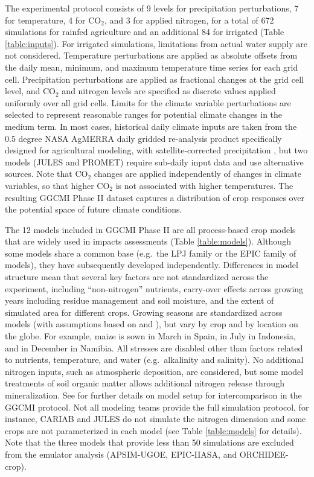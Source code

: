 \documentclass[gmd, manuscript]{copernicus} %
\begin{document}
The experimental protocol consists of 9 levels for precipitation perturbations, 7 for temperature, 4 for CO$_2$, and 3 for applied nitrogen, for a total of 672 simulations for rainfed agriculture and an additional 84 for irrigated (Table \ref{table:inputs}). For irrigated simulations, limitations from actual water supply are not considered. Temperature perturbations are applied as absolute offsets from the daily mean, minimum, and maximum temperature time series for each grid cell. Precipitation perturbations are applied as fractional changes at the grid cell level, and CO$_2$ and nitrogen levels are specified as discrete values applied uniformly over all grid cells. Limits for the climate variable perturbations are selected to represent reasonable ranges for potential climate changes in the medium term. In most cases, historical daily climate inputs are taken from the 0.5 degree NASA AgMERRA daily gridded re-analysis product specifically designed for agricultural modeling, with satellite-corrected precipitation \citep{Ruane2015}, but two models (JULES and PROMET) require sub-daily input data and use alternative sources. Note that CO$_2$ changes are applied independently of changes in climate variables, so that higher CO$_2$ is not associated with higher temperatures. The resulting GGCMI Phase II dataset captures a distribution of crop responses over the potential space of future climate conditions.

The 12 models included in GGCMI Phase II are all process-based crop models that are widely used in impacts assessments (Table \ref{table:models}). Although some models share a common base (e.g.\ the LPJ family or the EPIC family of models), they have subsequently developed independently. Differences in model structure mean that several key factors are not standardized across the experiment, including ``non-nitrogen'' nutrients, carry-over effects across growing years including residue management and soil moisture, and the extent of simulated area for different crops. Growing seasons are standardized across models (with assumptions based on \citet{Sacks2010} and \citet{Portmann2008, Portmann2010}), but vary by crop and by location on the globe. For example, maize is sown in March in Spain, in July in Indonesia, and in December in Namibia. All stresses are disabled other than factors related to nutrients, temperature, and water (e.g.\ alkalinity and salinity). No additional nitrogen inputs, such as atmospheric deposition, are considered, but some model treatments of soil organic matter allows additional nitrogen release through mineralization. See \citet{Elliott2015} for further details on model setup for intercomparison in the GGCMI protocol. Not all modeling teams provide the full simulation protocol, for instance, CARIAB and JULES do not simulate the nitrogen dimension and some crops are not parameterized in each model (see Table \ref{table:models} for details). Note that the three models that provide less than 50 simulations are excluded from the emulator analysis (APSIM-UGOE, EPIC-IIASA, and ORCHIDEE-crop).
\end{document}
